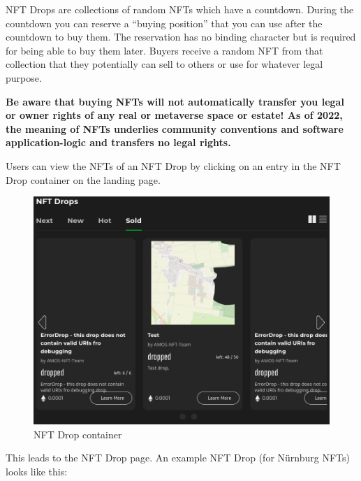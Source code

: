 \documentclass[
]{article}
\begin{document}
NFT Drops are collections of random NFTs which have a countdown. During
the countdown you can reserve a ``buying position'' that you can use
after the countdown to buy them. The reservation has no binding
character but is required for being able to buy them later. Buyers
receive a random NFT from that collection that they potentially can sell
to others or use for whatever legal purpose.

\textbf{Be aware that buying NFTs will not automatically transfer you
legal or owner rights of any real or metaverse space or estate! As of
2022, the meaning of NFTs underlies community conventions and software
application-logic and transfers no legal rights.}

Users can view the NFTs of an NFT Drop by clicking on an entry in the
NFT Drop container on the landing page.

\begin{figure}
\centering
\includegraphics{images/NFT_Drop_container.png}
\caption{NFT Drop container}
\end{figure}\newpage

This leads to the NFT Drop page. An example NFT Drop (for Nürnburg NFTs)
looks like this:
\end{document}
